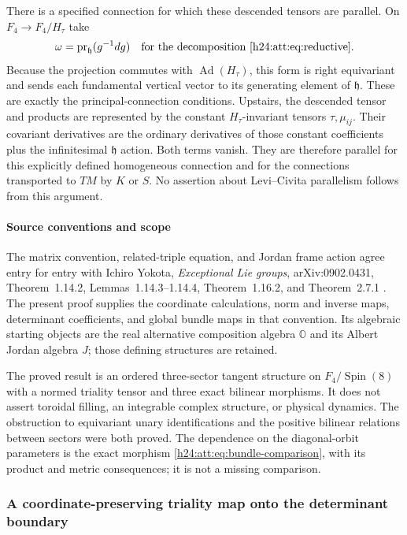 There is a specified connection for which these descended tensors
are parallel. On $F_4\to F_4/H_\tau$ take
\[
 \omega=\operatorname{pr}_{\mathfrak h}(g^{-1}dg)
 \quad\text{for the decomposition }\eqref{h24:att:eq:reductive}.
\]
Because the projection commutes with $\operatorname{Ad}(H_\tau)$,
this form is right equivariant and sends each fundamental vertical
vector to its generating element of $\mathfrak h$. These are exactly
the principal-connection conditions. Upstairs, the descended tensor
and products are represented by the constant $H_\tau$-invariant
tensors $\tau,\mu_{ij}$. Their covariant derivatives are the
ordinary derivatives of those constant coefficients plus the
infinitesimal $\mathfrak h$ action. Both terms vanish.
They are therefore parallel for this explicitly defined homogeneous
connection and for the connections transported to $TM$ by $K$ or $S$.
No assertion about Levi--Civita parallelism follows from this argument.

\paragraph{Source conventions and scope}

The matrix convention, related-triple equation, and Jordan frame
action agree entry for entry with Ichiro Yokota,
\emph{Exceptional Lie groups}, arXiv:0902.0431,
Theorem~1.14.2, Lemmas~1.14.3--1.14.4, Theorem~1.16.2, and
Theorem~2.7.1 \cite{h24:Yokota2009}. The present proof supplies the coordinate calculations,
norm and inverse maps, determinant coefficients, and global bundle
maps in that convention. Its algebraic starting objects are the
real alternative composition algebra $\mathbb O$ and its Albert
Jordan algebra $J$; those defining structures are retained.

The proved result is an ordered three-sector tangent structure on
$F_4/\operatorname{Spin}(8)$ with a normed triality tensor and three
exact bilinear morphisms. It does not assert toroidal filling,
an integrable complex structure, or physical dynamics.
The obstruction to equivariant unary identifications and the
positive bilinear relations between sectors were both proved.
The dependence on the diagonal-orbit parameters is the exact
morphism \eqref{h24:att:eq:bundle-comparison}, with its product and metric
consequences; it is not a missing comparison.


\subsubsection{A coordinate-preserving triality map onto the determinant boundary}
\label{h24:tri:sec:spectral-graph}

